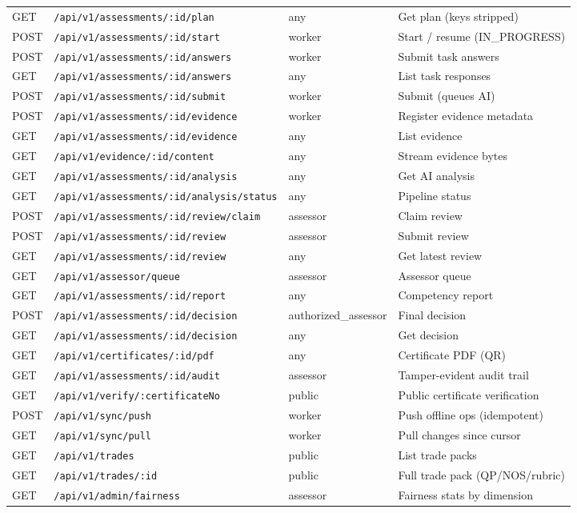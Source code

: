 \documentclass[11pt,a4paper]{article}
\newcommand{\code}[1]{\texttt{\small #1}}
\begin{document}
\begin{longtable}{L{1.15cm}L{7.7cm}L{1.95cm}L{4.5cm}}
GET & \code{/api/v1/assessments/:id/plan} & any & Get plan (keys stripped) \\
POST & \code{/api/v1/assessments/:id/start} & worker & Start / resume (IN\_PROGRESS) \\
POST & \code{/api/v1/assessments/:id/answers} & worker & Submit task answers \\
GET & \code{/api/v1/assessments/:id/answers} & any & List task responses \\
POST & \code{/api/v1/assessments/:id/submit} & worker & Submit (queues AI) \\
POST & \code{/api/v1/assessments/:id/evidence} & worker & Register evidence metadata \\
GET & \code{/api/v1/assessments/:id/evidence} & any & List evidence \\
GET & \code{/api/v1/evidence/:id/content} & any & Stream evidence bytes \\
GET & \code{/api/v1/assessments/:id/analysis} & any & Get AI analysis \\
GET & \code{/api/v1/assessments/:id/analysis/status} & any & Pipeline status \\
POST & \code{/api/v1/assessments/:id/review/claim} & assessor & Claim review \\
POST & \code{/api/v1/assessments/:id/review} & assessor & Submit review \\
GET & \code{/api/v1/assessments/:id/review} & any & Get latest review \\
GET & \code{/api/v1/assessor/queue} & assessor & Assessor queue \\
GET & \code{/api/v1/assessments/:id/report} & any & Competency report \\
POST & \code{/api/v1/assessments/:id/decision} & authorized\_assessor & Final decision \\
GET & \code{/api/v1/assessments/:id/decision} & any & Get decision \\
GET & \code{/api/v1/certificates/:id/pdf} & any & Certificate PDF (QR) \\
GET & \code{/api/v1/assessments/:id/audit} & assessor & Tamper-evident audit trail \\
GET & \code{/api/v1/verify/:certificateNo} & public & Public certificate verification \\
POST & \code{/api/v1/sync/push} & worker & Push offline ops (idempotent) \\
GET & \code{/api/v1/sync/pull} & worker & Pull changes since cursor \\
GET & \code{/api/v1/trades} & public & List trade packs \\
GET & \code{/api/v1/trades/:id} & public & Full trade pack (QP/NOS/rubric) \\
GET & \code{/api/v1/admin/fairness} & assessor & Fairness stats by dimension \\
\end{longtable}
\normalsize
\end{document}
